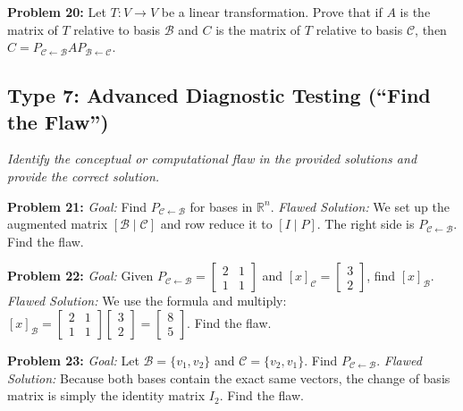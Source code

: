 \documentclass[11pt]{article}
\begin{document}
\vspace{0.5cm}
\textbf{Problem 20:} Let $T: V \to V$ be a linear transformation. Prove that if $A$ is the matrix of $T$ relative to basis $\mathcal{B}$ and $C$ is the matrix of $T$ relative to basis $\mathcal{C}$, then $C = P_{\mathcal{C} \leftarrow \mathcal{B}} A P_{\mathcal{B} \leftarrow \mathcal{C}}$.

\subsection*{Type 7: Advanced Diagnostic Testing (``Find the Flaw'')}
\textit{Identify the conceptual or computational flaw in the provided solutions and provide the correct solution.}

\vspace{0.5cm}
\textbf{Problem 21:} \textit{Goal:} Find $P_{\mathcal{C} \leftarrow \mathcal{B}}$ for bases in $\mathbb{R}^n$. \textit{Flawed Solution:} We set up the augmented matrix $[\mathcal{B} \mid \mathcal{C}]$ and row reduce it to $[I \mid P]$. The right side is $P_{\mathcal{C} \leftarrow \mathcal{B}}$. Find the flaw.

\vspace{0.5cm}
\textbf{Problem 22:} \textit{Goal:} Given $P_{\mathcal{C} \leftarrow \mathcal{B}} = \begin{bmatrix} 2 & 1 \\ 1 & 1 \end{bmatrix}$ and $[x]_{\mathcal{C}} = \begin{bmatrix} 3 \\ 2 \end{bmatrix}$, find $[x]_{\mathcal{B}}$. \textit{Flawed Solution:} We use the formula and multiply: $[x]_{\mathcal{B}} = \begin{bmatrix} 2 & 1 \\ 1 & 1 \end{bmatrix} \begin{bmatrix} 3 \\ 2 \end{bmatrix} = \begin{bmatrix} 8 \\ 5 \end{bmatrix}$. Find the flaw.

\vspace{0.5cm}
\textbf{Problem 23:} \textit{Goal:} Let $\mathcal{B} = \{v_1, v_2\}$ and $\mathcal{C} = \{v_2, v_1\}$. Find $P_{\mathcal{C} \leftarrow \mathcal{B}}$. \textit{Flawed Solution:} Because both bases contain the exact same vectors, the change of basis matrix is simply the identity matrix $I_2$. Find the flaw.
\end{document}
